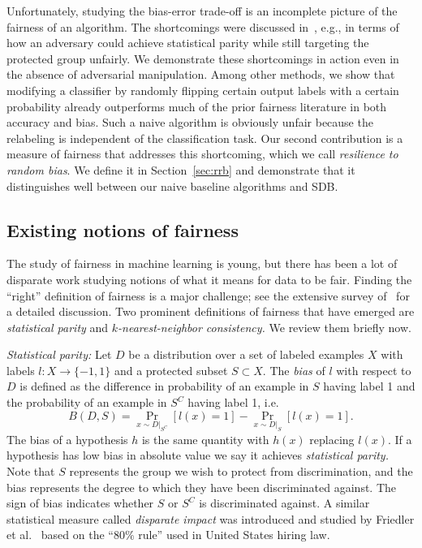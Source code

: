 \documentclass[twoside,leqno,twocolumn]{article}
\begin{document}
Unfortunately, studying the bias-error trade-off is an incomplete picture of
the fairness of an algorithm. The shortcomings were discussed
in~\cite{DworkHPR12}, e.g., in terms of how an adversary could achieve
statistical parity while still targeting the protected group unfairly. We
demonstrate these shortcomings in action even in the absence of adversarial
manipulation. Among other methods, we show that modifying a classifier by
randomly flipping certain output labels with a certain probability already
outperforms much of the prior fairness literature in both accuracy and bias.
Such a naive algorithm is obviously unfair because the relabeling is
independent of the classification task. Our second contribution is a measure of
fairness that addresses this shortcoming, which we call \emph{resilience to
random bias}. We define it in Section~\ref{sec:rrb} and demonstrate that it
distinguishes well between our naive baseline algorithms and SDB.

\subsection{Existing notions of fairness} 

The study of fairness in machine learning is young, but there has been a lot of
disparate work studying notions of what it means for data to be fair. Finding 
the ``right'' definition of fairness is a major challenge; see the extensive
survey of~\cite{RomeiR14} for a detailed discussion. Two prominent definitions
of fairness that have emerged are \emph{statistical parity} and
\emph{$k$-nearest-neighbor consistency.} We review them briefly now.

\emph{Statistical parity:} Let $D$ be a distribution over a set of labeled
examples $X$ with labels $l : X \to \{-1, 1\}$ and a protected subset $S \subset
X$. The \emph{bias} of $l$ with respect to $D$ is defined as the difference in
probability of an example in $S$ having label 1 and the probability of an
example in $S^C$ having label 1, i.e.  $$ B(D, S) = \Pr_{x \sim D|_{S^C}}[l(x)
= 1] - \Pr_{x \sim D|_{S}}[l(x) = 1].  $$ The bias of a hypothesis $h$ is the
same quantity with $h(x)$ replacing $l(x)$.  If a hypothesis has low bias in
absolute value we say it achieves \emph{statistical parity.} Note that $S$
represents the group we wish to protect from discrimination, and the bias
represents the degree to which they have been discriminated against.  The sign
of bias indicates whether $S$ or $S^C$ is discriminated against.  A similar
statistical measure called \emph{disparate impact} was introduced and studied
by Friedler et al.~\cite{FriedlerSV14} based on the ``$80\%$ rule'' used in
United States hiring law.
\end{document}
